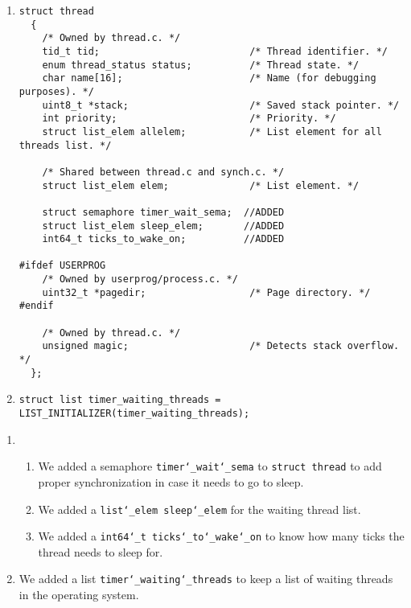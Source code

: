 \documentclass{article}
\renewcommand{\_}{\char`_}
\begin{document}
\begin{enumerate}
 \item \begin{lstlisting}
struct thread
  {
    /* Owned by thread.c. */
    tid_t tid;                          /* Thread identifier. */
    enum thread_status status;          /* Thread state. */
    char name[16];                      /* Name (for debugging purposes). */
    uint8_t *stack;                     /* Saved stack pointer. */
    int priority;                       /* Priority. */
    struct list_elem allelem;           /* List element for all threads list. */

    /* Shared between thread.c and synch.c. */
    struct list_elem elem;              /* List element. */

    struct semaphore timer_wait_sema;  //ADDED
    struct list_elem sleep_elem;       //ADDED 
    int64_t ticks_to_wake_on;          //ADDED 

#ifdef USERPROG
    /* Owned by userprog/process.c. */
    uint32_t *pagedir;                  /* Page directory. */
#endif

    /* Owned by thread.c. */
    unsigned magic;                     /* Detects stack overflow. */
  };
\end{lstlisting}

\item \begin{lstlisting}
struct list timer_waiting_threads = LIST_INITIALIZER(timer_waiting_threads);
\end{lstlisting}

\end{enumerate}

\begin{enumerate}
    \item 
    \begin{enumerate}
        \item We added a semaphore \texttt{timer\_wait\_sema} to \texttt{struct thread} to add proper synchronization in case it needs to go to sleep.
        \item We added a \texttt{list\_elem sleep\_elem} for the waiting
        thread list.
        \item We added a \texttt{int64\_t ticks\_to\_wake\_on} to know how many 
        ticks the thread needs to sleep for.
    \end{enumerate}
    \item We added a list \texttt{timer\_waiting\_threads} to keep a list of waiting
    threads in the operating system.
\end{enumerate}
\end{document}
